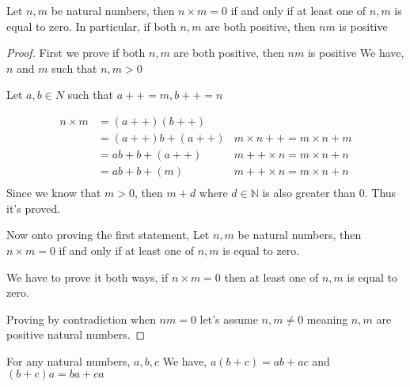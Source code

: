\documentclass[11pt]{report}
\begin{document}
\begin{lemma}
	Let $n,m$ be natural numbers, then $n \times m = 0$ if and only if at least one of $n,m$ is equal to zero. In particular, if both $n,m$ are both positive, then $nm$ is positive
\end{lemma}
\begin{proof}
	First we prove if both $n,m$ are both positive, then $nm$ is positive
	We have, $n$ and $m$ such that $n,m > 0$

	Let $a,b \in N$ such that $a++ = m, b++ = n$

	\begin{align*}
		n \times m & = (a++)(b++)     &                               \\
		           & = (a++)b + (a++) & m \times n++ = m \times n + m \\
		           & = ab + b + (a++) & m++ \times n = m \times n + n \\
		           & = ab + b + (m)   & m++ \times n = m \times n + n \\
	\end{align*}
	Since we know that $m>0$, then $m+d$ where $d \in \mathbb{N}$ is also greater than 0. Thus it's proved.

	Now onto proving the first statement, Let $n,m$ be natural numbers, then $n \times m = 0$ if and only if at least one of $n,m$ is equal to zero.

	We have to prove it both ways, if $n\times m = 0$ then at least one of $n,m$ is equal to zero.

	Proving by contradiction
	when $nm = 0$ let's assume $n,m \ne 0$ meaning $n,m$ are positive natural numbers.


\end{proof}
\begin{prop}
	For any natural numbers, $a,b,c$ We have, $a(b+c) = ab + ac$ and $(b+c)a = ba + ca$
\end{prop}
\end{document}

